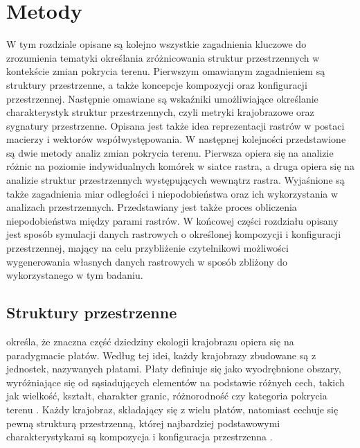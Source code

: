 \documentclass{amuthesis}
\begin{document}

\hypertarget{sec-metody}{%
\chapter{Metody}\label{sec-metody}}

W tym rozdziale opisane są kolejno wszystkie zagadnienia kluczowe do
zrozumienia tematyki określania zróżnicowania struktur przestrzennych w
kontekście zmian pokrycia terenu. Pierwszym omawianym zagadnieniem są
struktury przestrzenne, a także koncepcje kompozycji oraz konfiguracji
przestrzennej. Następnie omawiane są wskaźniki umożliwiające określanie
charakterystyk struktur przestrzennych, czyli metryki krajobrazowe oraz
sygnatury przestrzenne. Opisana jest także idea reprezentacji rastrów w
postaci macierzy i wektorów współwystępowania. W następnej kolejności
przedstawione są dwie metody analiz zmian pokrycia terenu. Pierwsza
opiera się na analizie różnic na poziomie indywidualnych komórek w
siatce rastra, a druga opiera się na analizie struktur przestrzennych
występujących wewnątrz rastra. Wyjaśnione są także zagadnienia miar
odległości i niepodobieństwa oraz ich wykorzystania w analizach
przestrzennych. Przedstawiany jest także proces obliczenia
niepodobieństwa między parami rastrów. W końcowej części rozdziału
opisany jest sposób symulacji danych rastrowych o określonej kompozycji
i konfiguracji przestrzennej, mający na celu przybliżenie czytelnikowi
możliwości wygenerowania własnych danych rastrowych w sposób zbliżony do
wykorzystanego w tym badaniu.

\hypertarget{struktury-przestrzenne}{%
\section{Struktury przestrzenne}\label{struktury-przestrzenne}}

\textcite{mcgarigal2009} określa, że znaczna część dziedziny ekologii
krajobrazu opiera się na paradygmacie płatów. Według tej idei, każdy
krajobrazy zbudowane są z jednostek, nazywanych płatami. Płaty definiuje
się jako wyodrębnione obszary, wyróżniające się od sąsiadujących
elementów na podstawie różnych cech, takich jak wielkość, kształt,
charakter granic, różnorodność czy kategoria pokrycia terenu
\autocite{forman1995land,solon2002,German_2004}. Każdy krajobraz,
składający się z wielu płatów, natomiast cechuje się pewną strukturą
przestrzenną, której najbardziej podstawowymi charakterystykami są
kompozycja i konfiguracja przestrzenna \autocite{Gustafson1998}.
\end{document}
